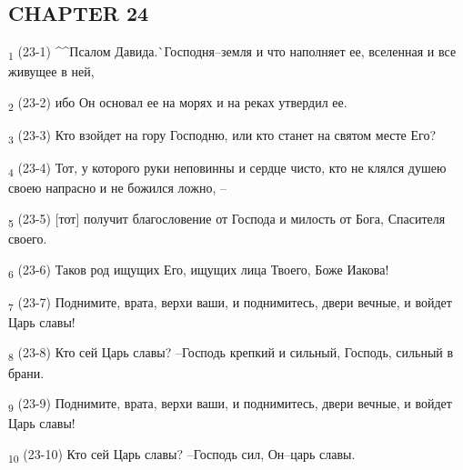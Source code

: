 \subsection{CHAPTER 24}
\begin{tcolorbox}
\textsubscript{1} (23-1) ^^Псалом Давида.^^ Господня--земля и что наполняет ее, вселенная и все живущее в ней,
\end{tcolorbox}
\begin{tcolorbox}
\textsubscript{2} (23-2) ибо Он основал ее на морях и на реках утвердил ее.
\end{tcolorbox}
\begin{tcolorbox}
\textsubscript{3} (23-3) Кто взойдет на гору Господню, или кто станет на святом месте Его?
\end{tcolorbox}
\begin{tcolorbox}
\textsubscript{4} (23-4) Тот, у которого руки неповинны и сердце чисто, кто не клялся душею своею напрасно и не божился ложно, --
\end{tcolorbox}
\begin{tcolorbox}
\textsubscript{5} (23-5) [тот] получит благословение от Господа и милость от Бога, Спасителя своего.
\end{tcolorbox}
\begin{tcolorbox}
\textsubscript{6} (23-6) Таков род ищущих Его, ищущих лица Твоего, Боже Иакова!
\end{tcolorbox}
\begin{tcolorbox}
\textsubscript{7} (23-7) Поднимите, врата, верхи ваши, и поднимитесь, двери вечные, и войдет Царь славы!
\end{tcolorbox}
\begin{tcolorbox}
\textsubscript{8} (23-8) Кто сей Царь славы? --Господь крепкий и сильный, Господь, сильный в брани.
\end{tcolorbox}
\begin{tcolorbox}
\textsubscript{9} (23-9) Поднимите, врата, верхи ваши, и поднимитесь, двери вечные, и войдет Царь славы!
\end{tcolorbox}
\begin{tcolorbox}
\textsubscript{10} (23-10) Кто сей Царь славы? --Господь сил, Он--царь славы.
\end{tcolorbox}
